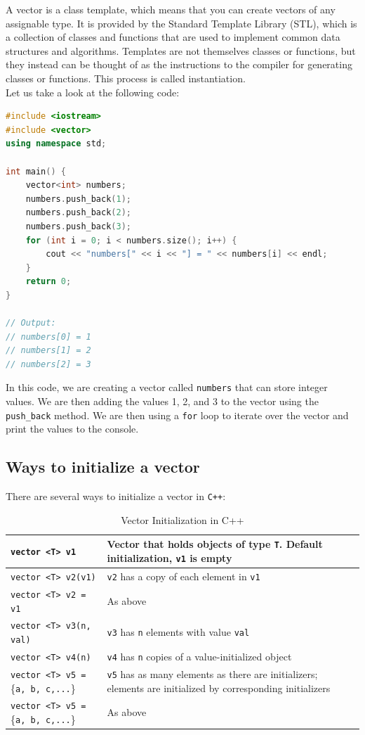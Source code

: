 A vector is a class template, which means that you can create vectors of any assignable type. It is provided by the Standard Template
Library (STL), which is a collection of classes and functions that are used to implement common data structures and algorithms.
Templates are not themselves classes or functions, but they instead can be thought of as the instructions to the compiler for 
generating classes or functions. This process is called instantiation.\\

Let us take a look at the following code:

\begin{lstlisting}[language=C++]
#include <iostream>
#include <vector>
using namespace std;

int main() {
    vector<int> numbers;
    numbers.push_back(1);
    numbers.push_back(2);
    numbers.push_back(3);
    for (int i = 0; i < numbers.size(); i++) {
        cout << "numbers[" << i << "] = " << numbers[i] << endl;
    }
    return 0;
}

// Output:
// numbers[0] = 1
// numbers[1] = 2
// numbers[2] = 3
\end{lstlisting}

In this code, we are creating a vector called \texttt{numbers} that can store integer values. We are then adding the values
1, 2, and 3 to the vector using the \texttt{push\_back} method. We are then using a \texttt{for} loop to iterate over the
vector and print the values to the console.\\

\subsection{Ways to initialize a vector}

There are several ways to initialize a vector in \texttt{C++}:\\

\begin{table}[ht]
\centering
\begin{tabular}{|l|p{7cm}|}
\hline
\texttt{vector <T> v1} & Vector that holds objects of type \texttt{T}. Default initialization, \texttt{v1} is empty \\
\hline
\texttt{vector <T> v2(v1)} & \texttt{v2} has a copy of each element in \texttt{v1} \\
\hline
\texttt{vector <T> v2 = v1} & As above \\
\hline
\texttt{vector <T> v3(n, val)} & \texttt{v3} has \texttt{n} elements with value \texttt{val} \\
\hline
\texttt{vector <T> v4(n)} & \texttt{v4} has \texttt{n} copies of a value-initialized object \\
\hline
\texttt{vector <T> v5 = }\{\texttt{a, b, c,...}\} & \texttt{v5} has as many elements as there are initializers; elements are initialized by corresponding initializers \\
\hline
\texttt{vector <T> v5 = }\{\texttt{a, b, c,...}\} & As above \\
\hline
\end{tabular}
\caption{Vector Initialization in C++}
\label{tab:vector_init}
\end{table}

